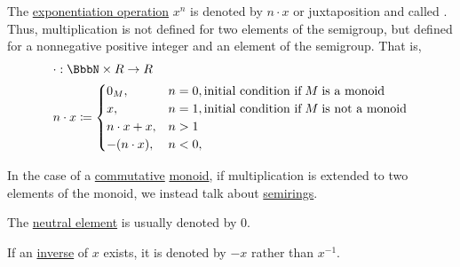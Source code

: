 \begin{concept}
\begin{thmenum}
     The \hyperref[def:semigroup/exponentiation]{exponentiation operation} \( x^n \) is denoted by \( n \cdot x \) or juxtaposition and called . Thus, multiplication is not defined for two elements of the semigroup, but defined for a nonnegative positive integer and an element of the semigroup. That is,
    \begin{equation}\label{eq:con:additive_semigroup/multiplication}
      \begin{aligned}
        &\cdot: \BbbN \times R \to R \\
        &n \cdot x \coloneqq \begin{cases}
          0_M,           &n = 0, \T{initial condition if} M \T{is a monoid} \\
          x,             &n = 1, \T{initial condition if} M \T{is not a monoid} \\
          n \cdot x + x, &n > 1 \\
          -(n \cdot x),  &n < 0, \\
        \end{cases}
      \end{aligned}
    \end{equation}

    In the case of a \hyperref[def:binary_operation/commutative]{commutative} \hyperref[def:monoid]{monoid}, if multiplication is extended to two elements of the monoid, we instead talk about \hyperref[def:semiring]{semirings}.

     The \hyperref[def:monoid]{neutral element} is usually denoted by \( 0 \).

     If an \hyperref[def:monoid_inverse]{inverse} of \( x \) exists, it is denoted by \( -x \) rather than \( x^{-1} \).
  \end{thmenum}
\end{concept}

